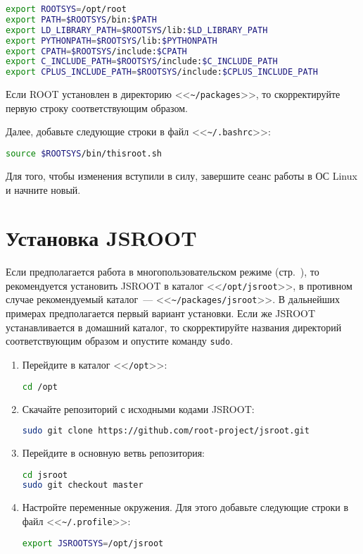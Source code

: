 \documentclass[12pt, a4paper, oneside, onecolumn]{book}
\newcommand{\ROOT}{\mbox{ROOT}}
\newcommand{\ROOTJS}{\mbox{JSROOT}}
\newcommand{\APP}[1]{\mbox{\tt #1}}
\newcommand{\DIRECTORY}[1]{<<{\tt #1}>>}
\newcommand{\FILE}[1]{<<{\tt #1}>>}
\begin{document}
\begin{lstlisting}[language=bash]
export ROOTSYS=/opt/root
export PATH=$ROOTSYS/bin:$PATH
export LD_LIBRARY_PATH=$ROOTSYS/lib:$LD_LIBRARY_PATH
export PYTHONPATH=$ROOTSYS/lib:$PYTHONPATH
export CPATH=$ROOTSYS/include:$CPATH
export C_INCLUDE_PATH=$ROOTSYS/include:$C_INCLUDE_PATH
export CPLUS_INCLUDE_PATH=$ROOTSYS/include:$CPLUS_INCLUDE_PATH
\end{lstlisting}

Если \ROOT{} установлен в директорию \DIRECTORY{\~{}/packages}, то скорректируйте первую строку соответствующим образом.

Далее, добавьте следующие строки в файл \FILE{\~{}/.bashrc}:

\begin{lstlisting}[language=bash]
source $ROOTSYS/bin/thisroot.sh
\end{lstlisting}

Для того, чтобы изменения вступили в силу, завершите сеанс работы в ОС Linux и начните новый.

\section{Установка \ROOTJS{}}

Если предполагается работа в многопользовательском режиме (стр.~\pageref{sec_multiuser}), то рекомендуется установить \ROOTJS{} в каталог \DIRECTORY{/opt/jsroot}, в противном случае рекомендуемый каталог~--- \DIRECTORY{\~{}/packages/jsroot}. В дальнейших примерах предполагается первый вариант установки. Если же \ROOTJS{} устанавливается в домашний каталог, то скорректируйте названия директорий соответствующим образом и опустите команду \APP{sudo}.

\begin{enumerate}
\item Перейдите в каталог \DIRECTORY{/opt}:

\begin{lstlisting}[language=bash]
cd /opt
\end{lstlisting}

\item Скачайте репозиторий с исходными кодами \ROOTJS{}:

\begin{lstlisting}[language=bash]
sudo git clone https://github.com/root-project/jsroot.git
\end{lstlisting}

\item Перейдите в основную ветвь репозитория:

\begin{lstlisting}[language=bash]
cd jsroot
sudo git checkout master
\end{lstlisting}

\item Настройте переменные окружения. Для этого добавьте следующие строки в файл \FILE{\~{}/.profile}:

\begin{lstlisting}[language=bash]
export JSROOTSYS=/opt/jsroot
\end{lstlisting}

\end{enumerate}
\end{document}
